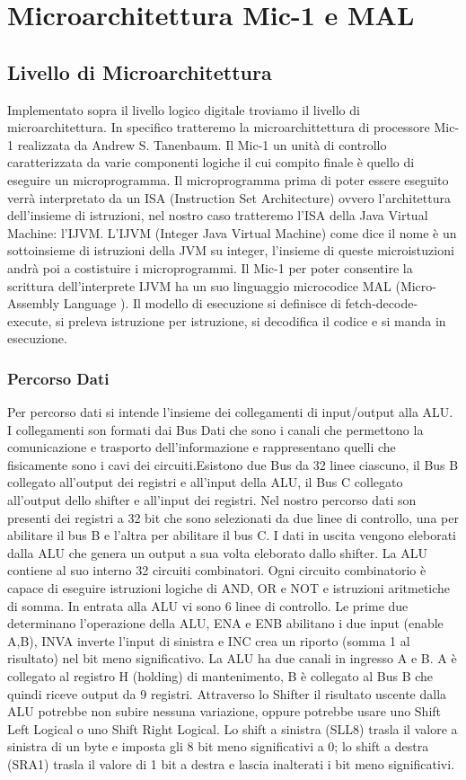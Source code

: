 \chapter{Microarchitettura Mic-1 e MAL}
\section{Livello di Microarchitettura}
Implementato sopra il livello logico digitale troviamo il livello di microarchitettura.
In specifico tratteremo la microarchittettura di processore Mic-1 realizzata da Andrew S. Tanenbaum.
Il Mic-1 un unità di controllo caratterizzata da varie componenti logiche il cui compito finale è quello di eseguire un microprogramma. Il microprogramma prima di poter essere eseguito verrà interpretato da un ISA (Instruction Set Architecture) ovvero l'architettura dell'insieme di istruzioni, nel nostro caso  tratteremo l'ISA della Java Virtual Machine: l'IJVM. L'IJVM (Integer Java Virtual Machine) come dice il nome è un sottoinsieme di istruzioni della JVM su integer, l'insieme di queste microistuzioni andrà poi a costistuire i microprogrammi. Il Mic-1 per poter consentire la scrittura dell'interprete IJVM ha un suo linguaggio microcodice MAL (Micro-Assembly Language ). Il modello di esecuzione si definisce di fetch-decode-execute, si preleva istruzione per istruzione, si decodifica il codice e si manda in esecuzione.
\subsection{Percorso Dati}
Per percorso dati si intende l'insieme dei collegamenti di input/output alla ALU. I collegamenti son formati dai Bus Dati che sono i canali che permettono la comunicazione e trasporto dell'informazione e rappresentano quelli che fisicamente sono i cavi dei circuiti.Esistono due Bus da 32 linee ciascuno, il Bus B collegato all'output dei registri e all'input della ALU, il Bus C collegato all'output dello shifter e all'input dei registri. Nel nostro percorso dati son presenti dei registri a 32 bit che sono selezionati da due linee di controllo, una per abilitare il bus B e l'altra per abilitare il bus C. I dati in uscita vengono eleborati dalla ALU che genera un output a sua volta eleborato dallo shifter. La ALU contiene al suo interno 32 circuiti combinatori. Ogni circuito combinatorio è capace di eseguire istruzioni logiche di AND, OR e NOT e istruzioni aritmetiche di somma. In entrata alla ALU vi sono 6 linee di controllo. Le prime due determinano l'operazione della ALU, ENA e ENB abilitano i due input (enable A,B), INVA inverte l'input di sinistra e INC crea un riporto (somma 1 al risultato) nel bit meno significativo. La ALU ha due canali in ingresso A e B.
A è collegato al registro H (holding) di mantenimento, B è collegato al Bus B che quindi riceve output da 9 registri. Attraverso lo Shifter il risultato uscente dalla ALU potrebbe non subire nessuna variazione, oppure	potrebbe usare uno Shift Left Logical o uno Shift Right Logical. Lo shift a sinistra (SLL8) trasla il valore a sinistra di un byte e imposta gli 8 bit meno significativi a 0; lo shift a destra (SRA1) trasla il valore di 1 bit a destra e lascia inalterati i bit meno significativi.
